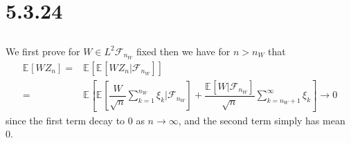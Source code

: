 \documentclass[11pt,a4paper]{ctexart}
\numberwithin{equation}{section}%
\newcommand{\F}{\mathcal{F}}
\begin{document}
% 


\section{5.3.24}


\subsection{}

We first prove for $ W\in L^2\F_{n_W} $ fixed then we have for $ n> n_W $ that 
\begin{align*}
    \mathbb{E}_{  }\left[ WZ_n \right] =& \mathbb{E}_{  }\left[ \mathbb{E}_{  }\left[ WZ_n|\F_{n_W} \right]  \right]\\
    =& \mathbb{E}_{  }\left[ \mathbb{E}_{  }\left[ \dfrac{ W }{ \sqrt{n} }\sum_{k=1}^{n_W}\xi _k |\F_{n_W} \right]  + \dfrac{ \mathbb{E}_{  }\left[ W|\F_{n_W} \right]  }{ \sqrt{n} }\sum_{k={n_W+1}}^\infty \xi _k   \right] \to 0
\end{align*}
since the first term decay to $ 0 $ as $ n\to\infty $, and the second term simply has mean 0.
\end{document}
